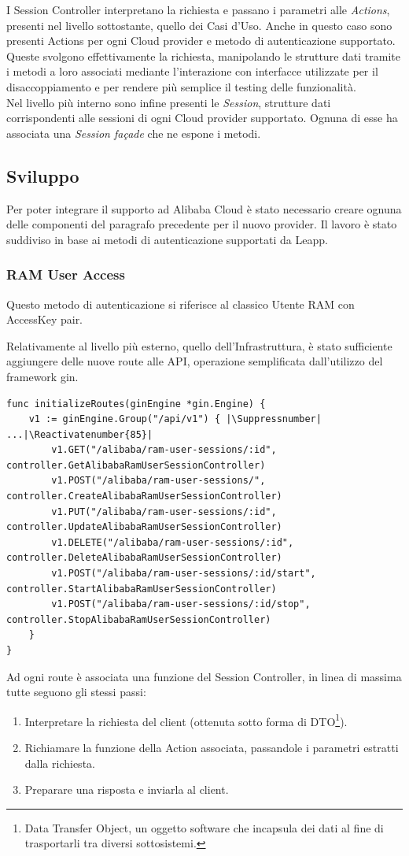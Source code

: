 \documentclass[a4paper]{article}
\makeatletter
\let\origthelstnumber\thelstnumber
\newcommand*\Suppressnumber{%
  \lst@AddToHook{OnNewLine}{%
    \let\thelstnumber\relax%
     \advance\c@lstnumber-\@ne\relax%
    }%
}
\newcommand*\Reactivatenumber[1]{%
  \setcounter{lstnumber}{\numexpr#1-1\relax}
  \lst@AddToHook{OnNewLine}{%
   \let\thelstnumber\origthelstnumber%
   \refstepcounter{lstnumber}
  }%
}
\makeatother
\begin{document}
I Session Controller interpretano la richiesta e passano i parametri alle \textit{Actions}, presenti nel livello sottostante, quello dei Casi d'Uso. Anche in questo caso sono presenti Actions per ogni Cloud provider e metodo di autenticazione supportato. Queste svolgono effettivamente la richiesta, manipolando le strutture dati tramite i metodi a loro associati mediante l'interazione con interfacce utilizzate per il disaccoppiamento e per rendere più semplice il testing delle funzionalità.\\
Nel livello più interno sono infine presenti le \textit{Session}, strutture dati corrispondenti alle sessioni di ogni Cloud provider supportato. Ognuna di esse ha associata una \textit{Session façade} che ne espone i metodi.

\subsection{Sviluppo}
Per poter integrare il supporto ad Alibaba Cloud è stato necessario creare ognuna delle componenti del paragrafo precedente per il nuovo provider. Il lavoro è stato suddiviso in base ai metodi di autenticazione supportati da Leapp.

\subsubsection{RAM User Access}
Questo metodo di autenticazione si riferisce al classico Utente RAM con AccessKey pair.

Relativamente al livello più esterno, quello dell'Infrastruttura, è stato sufficiente aggiungere delle nuove route alle API, operazione semplificata dall'utilizzo del framework gin.
\begin{lstlisting}[style=customgo, caption=engine.go (righe 53-92), captionpos=b, firstnumber=53]
func initializeRoutes(ginEngine *gin.Engine) {
	v1 := ginEngine.Group("/api/v1") { |\Suppressnumber|
...|\Reactivatenumber{85}|
		v1.GET("/alibaba/ram-user-sessions/:id", controller.GetAlibabaRamUserSessionController)
		v1.POST("/alibaba/ram-user-sessions/", controller.CreateAlibabaRamUserSessionController)
		v1.PUT("/alibaba/ram-user-sessions/:id", controller.UpdateAlibabaRamUserSessionController)
		v1.DELETE("/alibaba/ram-user-sessions/:id", controller.DeleteAlibabaRamUserSessionController)
		v1.POST("/alibaba/ram-user-sessions/:id/start", controller.StartAlibabaRamUserSessionController)
		v1.POST("/alibaba/ram-user-sessions/:id/stop", controller.StopAlibabaRamUserSessionController)
	}
}
\end{lstlisting}
Ad ogni route è associata una funzione del Session Controller, in linea di massima tutte seguono gli stessi passi:
\begin{enumerate}
 \item Interpretare la richiesta del client (ottenuta sotto forma di DTO\footnote{Data Transfer Object, un oggetto software che incapsula dei dati al fine di trasportarli tra diversi sottosistemi.}).
 \item Richiamare la funzione della Action associata, passandole i parametri estratti dalla richiesta.
 \item Preparare una risposta e inviarla al client.
\end{enumerate}
\end{document}
